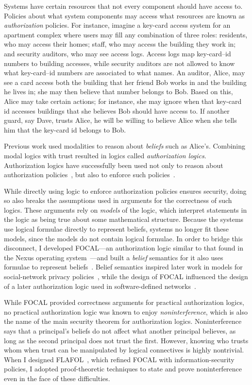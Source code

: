\documentclass{article}
\theoremstyle{definition}
\begin{document}
Systems have certain resources that not every component should have access to.
Policies about what system components may access what resources are known as \emph{authorization} policies.
For instance, imagine a key-card access system for an apartment complex where users may fill any combination of three roles: residents, who may access their homes; staff, who may access the building they work in; and security auditors, who may see access logs.
Access logs map key-card--id numbers to building accesses, while security auditors are not allowed to know what key-card--id numbers are associated to what names.
An auditor, Alice, may see a card access both the building that her friend Bob works in and the building he lives in; she may then believe that number belongs to Bob.
Based on this, Alice may take certain actions; for instance, she may ignore when that key-card id accesses buildings that she believes Bob should have access to.
If another guard, say Dave, trusts Alice, he will be willing to believe Alice when she tells him that the key-card id belongs to Bob.

Previous work used modalities to reason about \emph{beliefs} such as Alice's.
Combining modal logics with trust resulted in logics called \emph{authorization logics}.
Authorization logics have successfully been used not only to reason about authorization policies~\citep{Abadi06}, but also to enforce such policies~\cite{SchneiderWS11,SirerDBRSWWS11}.

While directly using logic to enforce authorization policies ensures security, doing so also breaks the assumptions used in arguments for the correctness of such logics.
These arguments rely on \emph{models} of the logic, which interpret statements in the logic as being true about some mathematical structure.
Because the systems use logical formulae directly to represent beliefs, systems no longer fit these models, since the models do not contain logical formulae.
In order to bridge this disconnect, I developed FOCAL---an authorization logic similar to that found in the Nexus operating system~\citep{SchneiderWS11,SirerDBRSWWS11}---and built a \emph{belief} semantics for it also uses formulae to represent beliefs~\citep{HirschC13}.
Belief semantics inspired later work in models for social-network privacy policies~\cite{PardoS17}, while the design of FOCAL influenced the design of a later authorization logic used in software-defined networks~\citep{SkalkaRDKGDSF19}.

While FOCAL provided correctness arguments for practical authorization logics, no practical authorization logic was known to enjoy \emph{noninterference}, which is also the name of the main security theorem for authorization logics.
Noninterference says that a principal's beliefs do not affect what another principal believes, as long as the second principal does not trust the first.
However, knowing who trusts whom when trust can be manipulated by logical connectives is highly nontrivial.
When I designed FLAFOL~\citep{HirschACAT20}, which refined FOCAL with information-security policies, I adopted proof-theoretic techniques to state and prove noninterference even in the face of these difficulties.
\end{document}
